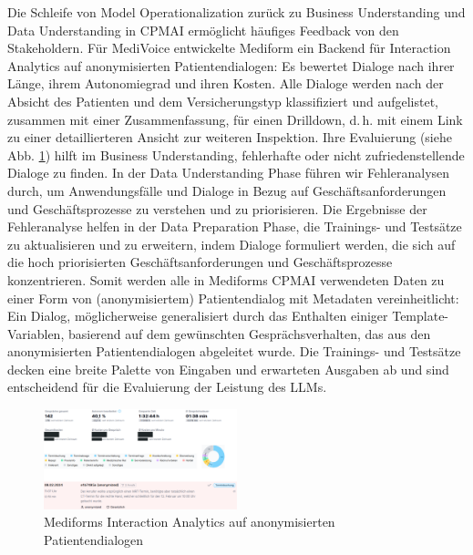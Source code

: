 \documentclass[twocolumn]{article}
\begin{document}
Die Schleife von Model Operationalization zurück zu Business Understanding und Data Understanding in CPMAI ermöglicht häufiges Feedback von den Stakeholdern. Für MediVoice entwickelte Mediform ein Backend für Interaction Analytics auf anonymisierten Patientendialogen: Es bewertet Dialoge nach ihrer Länge, ihrem Autonomiegrad und ihren Kosten. Alle Dialoge werden nach der Absicht des Patienten und dem Versicherungstyp klassifiziert und aufgelistet, zusammen mit einer Zusammenfassung, für einen Drilldown, d.\,h. mit einem Link zu einer detaillierteren Ansicht zur weiteren Inspektion. Ihre Evaluierung (siehe Abb. \ref{fig:interactionanalytics}) hilft im Business Understanding, fehlerhafte oder nicht zufriedenstellende Dialoge zu finden. In der Data Understanding Phase führen wir Fehleranalysen durch, um Anwendungsfälle und Dialoge in Bezug auf Geschäftsanforderungen und Geschäftsprozesse zu verstehen und zu priorisieren. Die Ergebnisse der Fehleranalyse helfen in der Data Preparation Phase, die Trainings- und Testsätze zu aktualisieren und zu erweitern, indem Dialoge formuliert werden, die sich auf die hoch priorisierten Geschäftsanforderungen und Geschäftsprozesse konzentrieren. Somit werden alle in Mediforms CPMAI verwendeten Daten zu einer Form von (anonymisiertem) Patientendialog mit Metadaten vereinheitlicht: Ein Dialog, möglicherweise generalisiert durch das Enthalten einiger Template-Variablen, basierend auf dem gewünschten Gesprächsverhalten, das aus den anonymisierten Patientendialogen abgeleitet wurde. Die Trainings- und Testsätze decken eine breite Palette von Eingaben und erwarteten Ausgaben ab und sind entscheidend für die Evaluierung der Leistung des LLMs.

\begin{figure}[hbt!]
  \begin{center}
\includegraphics[width=0.5\textwidth]{figures/InteractionAnalytics}
  \vspace{-8mm}
\caption{Mediforms Interaction Analytics auf anonymisierten Patientendialogen}
\label{fig:interactionanalytics}
\end{center}
\end{figure}
\end{document}

